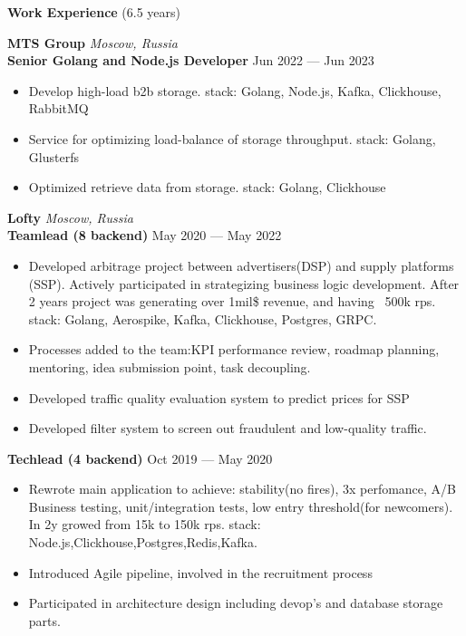 \documentclass{resume} %
\begin{document}
\begin{rSection}{\textbf{Work Experience} (6.5 years) }

\textbf{MTS Group} \hfill \textit{Moscow, Russia} \\
\textbf{Senior Golang and Node.js Developer}  \hfill Jun 2022 --- Jun 2023
\begin{itemize}
    \setlength\itemsep{-0.3em}
    \item Develop high-load b2b storage.
    stack: Golang, Node.js, Kafka, Clickhouse, RabbitMQ
    \item Service for optimizing load-balance of storage throughput.
    stack: Golang, Glusterfs
    \item Optimized retrieve data from storage.
    stack: Golang, Clickhouse
\end{itemize}

\textbf{Lofty} \hfill \textit{Moscow, Russia} \\
\textbf{Teamlead (8 backend)} \hfill May 2020 --- May 2022
\begin{itemize}
    \setlength\itemsep{-0.3em}
    \item Developed arbitrage project between advertisers(DSP) and supply platforms (SSP). Actively participated in strategizing
    	   business logic development.
    	   After 2 years project was generating over 1mil\$ revenue, and having ~500k rps.
	    \\ stack: Golang, Aerospike, Kafka, Clickhouse, Postgres, GRPC\@.
    \item Processes added to the team:KPI performance review, roadmap planning, mentoring, idea submission point, task decoupling.
    \item Developed traffic quality evaluation system to predict prices for SSP
    \item Developed filter system to screen out fraudulent and low-quality traffic.
\end{itemize}

\textbf{Techlead (4 backend)} \hfill Oct 2019 --- May 2020
\begin{itemize}
    \setlength\itemsep{-0.3em}
    \item Rewrote main application to achieve: stability(no fires), 3x perfomance, A/B Business testing, unit/integration tests, low
    	    entry threshold(for newcomers).
    	    In 2y growed from 15k to 150k rps.
    	    stack: Node.js,Clickhouse,Postgres,Redis,Kafka.
    \item Introduced Agile pipeline, involved in the recruitment process
    \item Participated in architecture design including devop's and database storage parts.
\end{itemize}


\end{rSection}
\end{document}
